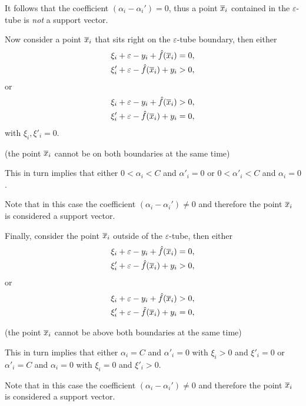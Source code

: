 \documentclass[a4paper,blends,pdf,colorBG,slideColor]{prosper}
\begin{document}
It  follows that the coefficient $ (\alpha_i - \alpha_i') = 0$, thus a point $\overline{x}_i$ contained
in the $\varepsilon$-tube is {\em not} a support vector.
\es

Now consider a point $\overline{x}_i$ that sits right on the $\varepsilon$-tube boundary, then either
\begin{align*}
\xi_i + \varepsilon- y_i + \hat{f}(\overline{x}_i)  &= 0,\\
\xi_i' + \varepsilon - \hat{f}(\overline{x}_i)  + y_i  &> 0, \\
\end{align*}
or
\begin{align*}
\xi_i + \varepsilon- y_i + \hat{f}(\overline{x}_i)  &> 0,\\
\xi_i' + \varepsilon - \hat{f}(\overline{x}_i)  + y_i  &= 0, \\
\end{align*}
with $\xi_i,\xi'_i=0$.

(the point $\overline{x}_i$ cannot be on both boundaries at the same time)

This in turn implies that either $0 < \alpha_i< C$ and $\alpha'_i = 0$ or 
$0 < \alpha'_i< C$ and $\alpha_i = 0$.

Note that in this case the coefficient $(\alpha_i - \alpha_i') \ne 0$ and therefore the point $\overline{x}_i$
is considered a support vector.
\es


Finally, consider the point $\overline{x}_i$ outside of the $\varepsilon$-tube, then either
\begin{align*}
\xi_i + \varepsilon- y_i + \hat{f}(\overline{x}_i)  &= 0,\\
\xi_i' + \varepsilon - \hat{f}(\overline{x}_i)  + y_i  &> 0, \\
\end{align*}
or
\begin{align*}
\xi_i + \varepsilon- y_i + \hat{f}(\overline{x}_i)  &> 0,\\
\xi_i' + \varepsilon - \hat{f}(\overline{x}_i)  + y_i  &= 0, \\
\end{align*}

(the point $\overline{x}_i$ cannot be above both boundaries at the same time)

This in turn implies that either $\alpha_i = C$ and $\alpha'_i = 0$ with $\xi_i > 0$ and $\xi'_i=0$ or 
$\alpha'_i = C$ and $\alpha_i = 0$ with $\xi_i = 0$ and $\xi'_i > 0$.

Note that in this case the coefficient $(\alpha_i - \alpha_i') \ne 0$ and therefore the point $\overline{x}_i$
is considered a support vector.
\es
\end{document}
